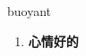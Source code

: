 
\begin{frame}
{\huge buoyant}
\begin{center}
\begin{enumerate}\Large
  \item \textbf{心情好的}
\end{enumerate}
\end{center}
\end{frame}
